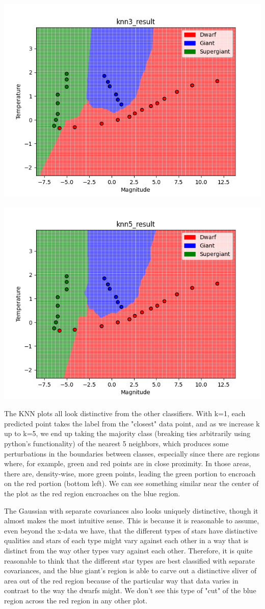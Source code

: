 \documentclass[submit]{harvardml}
\begin{document}
\begin{enumerate}
    \includegraphics[width=.7\textwidth]{knn3_result.png}
    
    \includegraphics[width=.7\textwidth]{knn5_result.png}
    
    The KNN plots all look distinctive from the other classifiers. With k=1, each predicted point takes the label from the "closest" data point, and as we increase k up to k=5, we end up taking the majority class (breaking ties arbitrarily using python's functionality) of the nearest 5 neighbors, which produces some perturbations in the boundaries between classes, especially since there are regions where, for example, green and red points are in close proximity. In those areas, there are, density-wise, more green points, leading the green portion to encroach on the red portion (bottom left). We can see something similar near the center of the plot as the red region encroaches on the blue region. 
    
    The Gaussian with separate covariances also looks uniquely distinctive, though it almost makes the most intuitive sense. This is because it is reasonable to assume, even beyond the x-data we have, that the different types of stars have distinctive qualities and stars of each type might vary against each other in a way that is distinct from the way other types vary against each other. Therefore, it is quite reasonable to think that the different star types are best classified with separate covariances, and the blue giant's region is able to carve out a distinctive sliver of area out of the red region because of the particular way that data varies in contrast to the way the dwarfs might. We don't see this type of "cut" of the blue region across the red region in any other plot. 
    

\end{enumerate}
\end{document}
